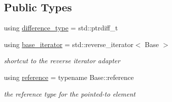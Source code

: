 \subsection*{Public Types}
\begin{DoxyCompactItemize}
\item 
using \hyperlink{classnlohmann_1_1detail_1_1json__reverse__iterator_a9ab55987c05ec6427ad36082e351cc45}{difference\+\_\+type} = std\+::ptrdiff\+\_\+t
\item 
using \hyperlink{classnlohmann_1_1detail_1_1json__reverse__iterator_a6b2ef1d632fe49bfcc22fbd1abd62395}{base\+\_\+iterator} = std\+::reverse\+\_\+iterator$<$ Base $>$
\begin{DoxyCompactList}\small\item\em shortcut to the reverse iterator adapter \end{DoxyCompactList}\item 
using \hyperlink{classnlohmann_1_1detail_1_1json__reverse__iterator_a42f51a69bac7b2aebb613b2164e457f1}{reference} = typename Base\+::reference
\begin{DoxyCompactList}\small\item\em the reference type for the pointed-\/to element \end{DoxyCompactList}\end{DoxyCompactItemize}
